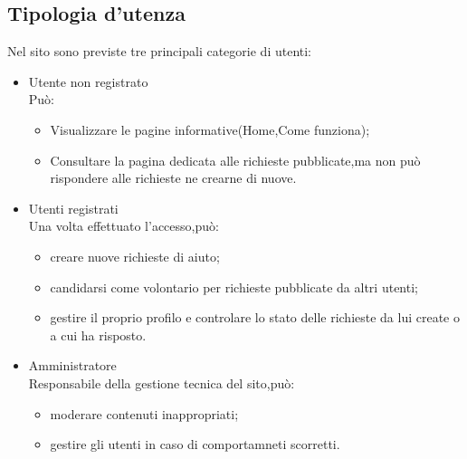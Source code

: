 \documentclass[a4paper,11pt]{article}
\begin{document}
\subsection{Tipologia d'utenza}
Nel sito sono previste tre principali categorie di utenti:
\begin{itemize}
    \item Utente non registrato\\Può:
    \begin{itemize}
        \item Visualizzare le pagine informative(Home,Come funziona);
        \item Consultare la pagina dedicata alle richieste pubblicate,ma non può rispondere alle richieste ne crearne di nuove.
    \end{itemize}
    \item Utenti registrati\\Una volta effettuato l'accesso,può:
    \begin{itemize}
        \item creare nuove richieste di aiuto;
        \item candidarsi come volontario per richieste pubblicate da altri utenti;
        \item gestire il proprio profilo e controlare lo stato delle richieste da lui create o a cui ha risposto.
    \end{itemize}
    \item Amministratore\\Responsabile della gestione tecnica del sito,può:
    \begin{itemize}
        \item moderare contenuti inappropriati;
        \item gestire gli utenti in caso di comportamneti scorretti.
    \end{itemize}
\end{itemize}
\end{document}

